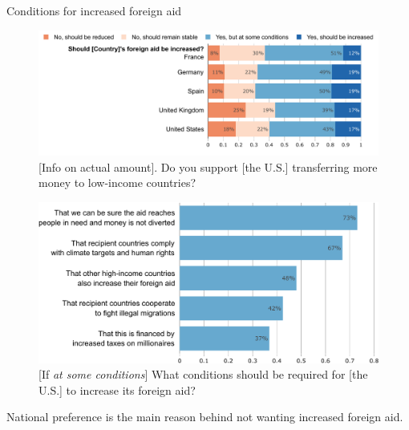 \documentclass[aspectratio=169,xcolor=dvipsnames, 11pt,mathserif]{beamer}
\begin{document}
\begin{frame}{Conditions for increased foreign aid \label{foreign_aid_conditions} \hyperlink{other_policies}{}}
    \begin{figure} \vspace{-.2cm}
        \centering 
        \caption{[Info on actual amount]. Do you support [the U.S.] transferring more money to low-income countries?}\vspace{-.2cm}
        \includegraphics[width=.7\textwidth]{../figures/all/foreign_aid_raise_support.pdf} 
    \end{figure}\vspace{-.2cm} \pause
    \begin{figure} 
        \centering 
        \caption{[If \textit{at some conditions}] What conditions should be required for [the U.S.] to increase its foreign aid?}\vspace{-.2cm}
        \includegraphics[height=.48\textheight]{../figures/all/foreign_aid_condition.pdf} 
    \end{figure} \pause \vspace{-.3cm}
	\bbvs \ip {}%
	\ip National preference is the main reason behind not wanting increased foreign aid.
	\ee 
\end{frame}
\end{document}
